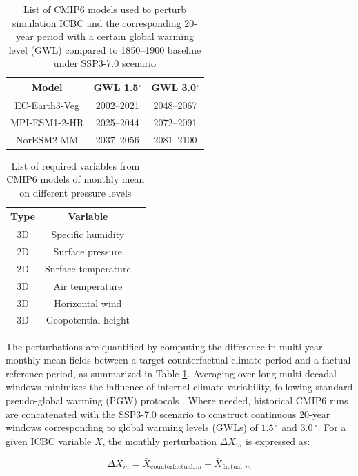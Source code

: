 \documentclass[journal abbreviation, manuscript]{copernicus}
\begin{document}
\begin{table}[h] 
\centering
\caption{List of CMIP6 models used to perturb simulation ICBC and the corresponding 20-year period with a certain global warming level (GWL) compared to 1850--1900 baseline under SSP3-7.0 scenario \citep{hauser2022transient}}
\begin{tabular}{ccc} 
\hline
\textbf{Model} & \textbf{GWL 1.5$^\circ$} & \textbf{GWL 3.0$^\circ$} \\
\hline
EC-Earth3-Veg & 2002--2021 & 2048--2067 \\
MPI-ESM1-2-HR & 2025--2044 & 2072--2091 \\
NorESM2-MM & 2037--2056 & 2081--2100 \\
\hline
\end{tabular}
\label{table:cmip6}
\end{table}

\begin{table}[h] 
\centering
\caption{List of required variables from CMIP6 models of monthly mean on different pressure levels}
\begin{tabular}{ccc} 
\hline
\textbf{Type} & \textbf{Variable} \\
\hline
3D	&Specific humidity \\
2D	&Surface pressure \\
2D	&Surface temperature \\
3D	&Air temperature \\
3D	&Horizontal wind \\
3D	&Geopotential height \\
\hline
\end{tabular}
\label{table:cmip6_vars}
\end{table}

The perturbations are quantified by computing the difference in multi-year monthly mean fields between a target counterfactual climate period and a factual reference period, as summarized in Table \ref{table:cmip6}. Averaging over long multi-decadal windows minimizes the influence of internal climate variability, following standard pseudo-global warming (PGW) protocols \citep{brogli2023pseudo}. Where needed, historical CMIP6 runs are concatenated with the SSP3-7.0 scenario to construct continuous 20-year windows corresponding to global warming levels (GWLs) of $1.5\,\unit{^\circ}$ and $3.0\,\unit{^\circ}$. For a given ICBC variable $X$, the monthly perturbation $\Delta X_m$ is expressed as:

\begin{equation} \label{eq:delta}
    \Delta X_m = \bar{X}_{\text{counterfactual}, m} - \bar{X}_{\text{factual}, m}
\end{equation}
\end{document}
